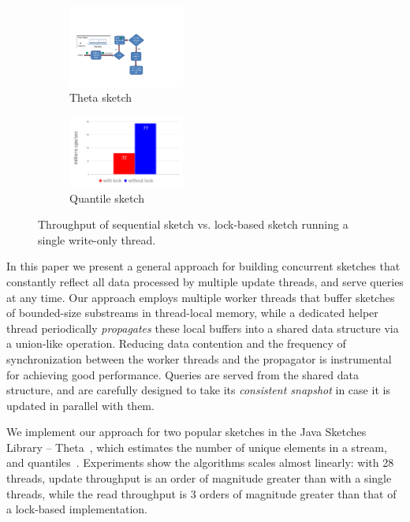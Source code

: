 \begin{figure}[t!]
    \centering
    \begin{subfigure}[t]{0.49\columnwidth}
       \centering
        \includegraphics[width=1.5in]{images/seqTheta}
        \caption{Theta sketch}
        \label{fig:LockIsBadTheta}
    \end{subfigure}%
    \begin{subfigure}[t]{0.49\columnwidth}
        \centering
        \includegraphics[width=1.5in]{images/seqQuantiles}
        \caption{Quantile sketch}
        \label{fig:LockIsBadQuantiles}
    \end{subfigure}
    \caption{Throughput of sequential sketch vs. lock-based sketch running a single write-only thread.}
    \label{fig:lockBased}
\end{figure}



In this paper 
we present a general approach for building concurrent sketches that
constantly reflect all data processed by multiple update threads, 
and serve queries at any time. %
Our  approach employs multiple worker threads that buffer sketches of bounded-size substreams in thread-local memory, while a dedicated helper thread 
periodically \emph{propagates} these local buffers into a shared data structure via a union-like operation.
 Reducing data contention and the frequency of synchronization between the worker threads and the propagator is instrumental for achieving good performance. Queries are served from the shared data structure, and are carefully 
 designed to take its \emph{consistent snapshot} in case it is updated in parallel with them.

We implement our approach for two popular sketches in the Java Sketches Library -- Theta~\cite{Theta},
which estimates the number of unique elements in a stream, and quantiles~\cite{quantiles}.
Experiments show the algorithms scales almost linearly: with 28 threads, update throughput is an order of magnitude greater than with a single threads, while the 
read throughput is 3 orders of magnitude greater than that of a lock-based implementation.  


 
